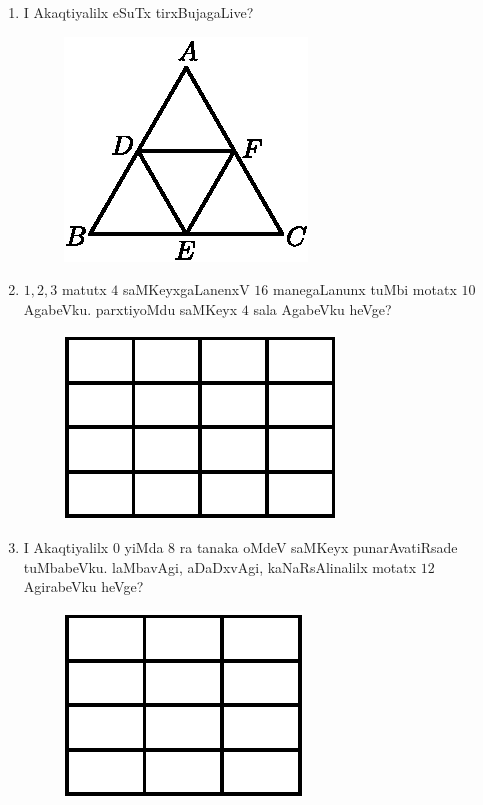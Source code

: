 \begin{enumerate}
\item I Akaqtiyalilx eSuTx tirxBujagaLive?
\begin{figure}[H]
\centering
\includegraphics{src/figures/exr16.eps}
\end{figure}


\item $1,2,3$ matutx $4$ saMKeyxgaLanenxV $16$ manegaLanunx tuMbi motatx $10$ AgabeVku. parxtiyoMdu saMKeyx $4$ sala AgabeVku heVge?
\begin{figure}[H]
\centering
\includegraphics{src/figures/exr17.eps}
\end{figure}

\item I Akaqtiyalilx $0$ yiMda $8$ ra tanaka oMdeV saMKeyx punarAvatiRsade tuMbabeVku. laMbavAgi, aDaDxvAgi, kaNaRsAlinalilx motatx $12$ AgirabeVku heVge?
\begin{figure}[H]
\centering
\includegraphics{src/figures/exr18.eps}
\end{figure}


\end{enumerate}
